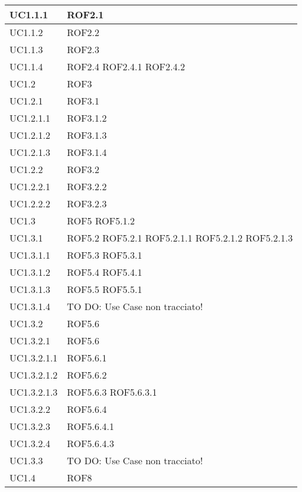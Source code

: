 \begin{center}
\begin{longtable}{| p{4cm} | p{4cm} |}
\hline
UC1.1.1 & ROF2.1 \\
\hline
UC1.1.2 & ROF2.2 \\
\hline
UC1.1.3 & ROF2.3 \\
\hline
UC1.1.4 & ROF2.4 \newline ROF2.4.1 \newline ROF2.4.2 \\
\hline
UC1.2 & ROF3 \\
\hline
UC1.2.1 & ROF3.1 \\
\hline
UC1.2.1.1 & ROF3.1.2 \\
\hline
UC1.2.1.2 & ROF3.1.3 \\
\hline
UC1.2.1.3 & ROF3.1.4 \\
\hline
UC1.2.2 & ROF3.2 \\
\hline
UC1.2.2.1 & ROF3.2.2 \\
\hline
UC1.2.2.2 & ROF3.2.3 \\
\hline
UC1.3 & ROF5 \newline ROF5.1.2 \\
\hline
UC1.3.1 & ROF5.2 \newline ROF5.2.1 \newline ROF5.2.1.1 \newline ROF5.2.1.2 \newline ROF5.2.1.3 \\
\hline
UC1.3.1.1 & ROF5.3 \newline ROF5.3.1 \\
\hline
UC1.3.1.2 & ROF5.4 \newline ROF5.4.1 \\
\hline
UC1.3.1.3 & ROF5.5 \newline ROF5.5.1 \\
\hline
UC1.3.1.4 & TO DO: Use Case non tracciato! \\
\hline
UC1.3.2 & ROF5.6 \\
\hline
UC1.3.2.1 & ROF5.6 \\
\hline
UC1.3.2.1.1 & ROF5.6.1 \\
\hline
UC1.3.2.1.2 & ROF5.6.2 \\
\hline
UC1.3.2.1.3 & ROF5.6.3 \newline ROF5.6.3.1 \\
\hline
UC1.3.2.2 & ROF5.6.4 \\
\hline
UC1.3.2.3 & ROF5.6.4.1 \\
\hline
UC1.3.2.4 & ROF5.6.4.3 \\
\hline
UC1.3.3 & TO DO: Use Case non tracciato! \\
\hline
UC1.4 & ROF8 \\

\end{longtable}
\end{center}
